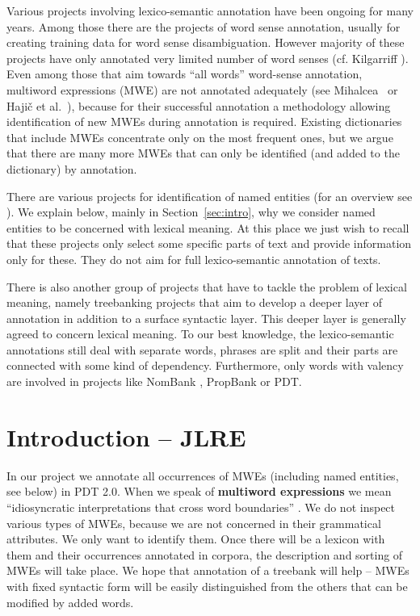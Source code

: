 Various projects involving lexico-semantic annotation have been ongoing for many years. 
Among those there are the projects of word sense annotation, usually for creating training data for word sense disambiguation. However majority of these projects have only annotated very limited number of word senses (cf. Kilgarriff \citeyear{kilgarriff:1998}). Even among those that aim towards ``all words'' word-sense annotation, multiword expressions (MWE) are not annotated adequately (see Mihalcea~\citeyear{mihalcea:1998} or Hajič et al.~\citeyear{hajic-cwn:04}), 
because for their successful annotation a metho\-do\-logy allowing identification of new MWEs during annotation is required. Existing dictionaries that include MWEs concentrate only on the most frequent ones, but we argue that there are many more MWEs that can only be identified (and added to the dictionary) by annotation.

There are various projects for identification of named entities (for an overview see \citealp{sevcikova:2007}). We explain below, mainly in Section~\ref{sec:intro}, why we consider named entities to be concerned with lexical meaning. At this place we just wish to recall that these projects only select some specific parts of text and provide information only for these. They do not aim for full lexico-semantic annotation of texts.

There is also another group of projects that have to tackle the problem of lexical meaning, namely treebanking projects that aim to develop a deeper layer of annotation in addition to a surface syntactic layer. This deeper layer is generally agreed to concern lexical meaning. To our best knowledge, the lexico-semantic annotations still deal with separate words, phrases are split and their parts are connected with some kind of dependency. Furthermore, only words with valency are involved in projects like NomBank \citep{nombank}, PropBank \citep{propbank} or PDT.

\nocite{erbach:1993}

\section{Introduction – JLRE}
\label{sec:intro:intro-old}
In our project we annotate all occurrences of MWEs (including named entities, see below) in PDT 2.0. 
When we speak of \textbf{multiword expressions} we mean ``idiosyncratic interpretations that cross word boundaries'' \citep{sag:2002}. We do not inspect various types of MWEs, because we are not concerned in their grammatical attributes. We only want to identify them. Once there will be a lexicon with them and their occurrences annotated in corpora, the description and sorting of MWEs will take place. We hope that annotation of a treebank will help -- MWEs with fixed syntactic form will be easily distinguished from the others that can be modified by added words.

